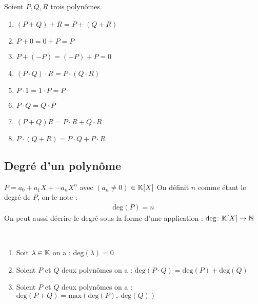 \begin{graybox}
    \begin{proposition}
        Soient $P, Q, R$ trois polynômes.   
        \begin{enumerate}
            \item $(P + Q) + R = P + (Q + R)$
            \item $P + 0 = 0 + P = P$
            \item $P + (-P) = (-P) + P = 0$
            \item $(P \cdot Q) \cdot R = P \cdot (Q \cdot R)$
            \item $P \cdot 1 = 1 \cdot P = P$
            \item $P \cdot Q = Q \cdot P$ 
            \item $(P + Q) R = P \cdot R + Q \cdot R$
            \item $P \cdot (Q + R) = P \cdot Q + P \cdot R$
        \end{enumerate}
    \end{proposition}
\end{graybox}

\subsection{Degré d'un polynôme}
\begin{graybox}
    \begin{definition}
        $P = a_0 + a_1 X + \cdots a_n X^n$ avec $(a_n \neq 0)$ $\in \mathbb{K}[X]$
        On définit $n$ comme étant le degré de $P$, on le note :
        \begin{align*}
            \mathrm{deg}(P) = n
        \end{align*}
        On peut aussi décrire le degré sous la forme d'une application :
        $\mathrm{deg} \colon \mathbb{K}[X] \to \mathbb{N}$
    \end{definition}
\end{graybox}

\begin{graybox}
    \begin{proposition}~ 
        \begin{enumerate}
            \item Soit $\lambda \in \mathbb{K}$ on a : $\mathrm{deg}(\lambda) = 0$
            \item Soient $P$ et $Q$ deux polynômes on a : $\mathrm{deg}(P \cdot Q) = \mathrm{deg}(P) + \mathrm{deg}(Q)$
            \item Soient $P$ et $Q$ deux polynômes on a :
            $\mathrm{deg}(P + Q) = \mathrm{max}\left(\mathrm{deg}(P),\ \mathrm{deg}(Q)\right)$
        \end{enumerate}
    \end{proposition}
\end{graybox}

